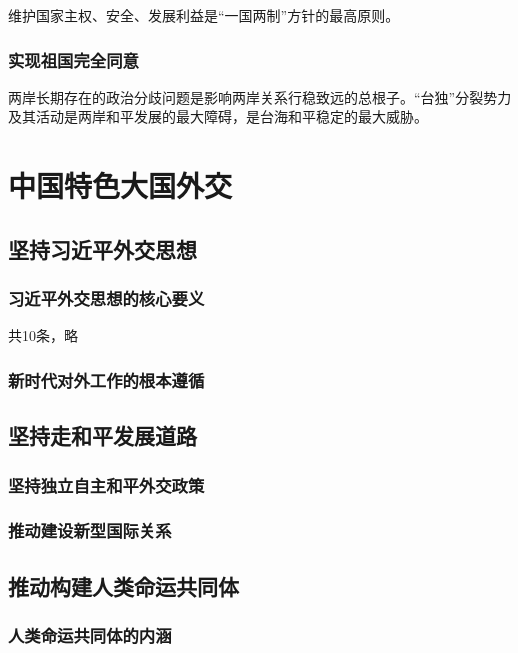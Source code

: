 \documentclass[12pt, a4paper, oneside]{ctexart}
\begin{document}
维护国家主权、安全、发展利益是“一国两制”方针的最高原则。

\subsubsection{实现祖国完全同意}

两岸长期存在的政治分歧问题是影响两岸关系行稳致远的总根子。“台独”分裂势力及其活动是两岸和平发展的最大障碍，是台海和平稳定的最大威胁。

\section{中国特色大国外交}

\subsection{坚持习近平外交思想}

\subsubsection{习近平外交思想的核心要义}

共10条，略

\subsubsection{新时代对外工作的根本遵循}

\subsection{坚持走和平发展道路}

\subsubsection{坚持独立自主和平外交政策}

\subsubsection{推动建设新型国际关系}

\subsection{推动构建人类命运共同体}

\subsubsection{人类命运共同体的内涵}
\end{document}
